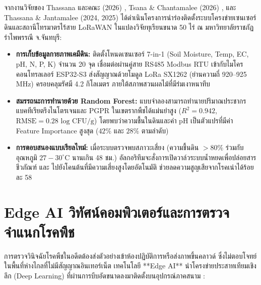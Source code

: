 \begin{application}
จากงานวิจัยของ Thassana และคณะ (2026) \cite{thassana_2026}, Tsana \& Chantamalee (2026) \cite{tsana2026edge}, และ Thassana \& Jantamalee (2024, 2025) \cite{thassana_2024_soil, thassana_2025_aiot} ได้ดำเนินโครงการนำร่องติดตั้งระบบโครงข่ายเซนเซอร์ดินและสถานีโทรมาตรไร้สาย LoRaWAN ในแปลงวิจัยทุเรียนขนาด 50 ไร่ ณ มหาวิทยาลัยราชภัฏรำไพพรรณี จ.จันทบุรี:
\begin{itemize}
    \item \textbf{การเก็บข้อมูลกายภาพเคมีดิน:} ติดตั้งโหนดเซนเซอร์ 7-in-1 (Soil Moisture, Temp, EC, pH, N, P, K) จำนวน 20 จุด เชื่อมต่อผ่านคู่สาย RS485 Modbus RTU เข้ากับไมโครคอนโทรลเลอร์ ESP32-S3 ส่งสัญญาณด้วยโมดูล LoRa SX1262 (ย่านความถี่ 920--925 MHz) ครอบคลุมรัศมี 4.2 กิโลเมตร ภายใต้สภาพสวนผลไม้ที่มีร่มเงาหนาทึบ
    \item \textbf{สมรรถนะการทำนายด้วย Random Forest:} แบบจำลองสามารถทำนายปริมาณประชากรแบคทีเรียตรึงไนโตรเจนและ PGPR ในเขตรากพืชได้แม่นยำสูง ($R^2 = 0.942$, $\text{RMSE} = 0.28\text{ log CFU/g}$) โดยพบว่าความชื้นในดินและค่า pH เป็นตัวแปรที่มีค่า Feature Importance สูงสุด ($42\%$ และ $28\%$ ตามลำดับ)
    \item \textbf{การตอบสนองแบบเรียลไทม์:} เมื่อระบบตรวจพบสภาวะเสี่ยง (ความชื้นดิน $>80\%$ ร่วมกับอุณหภูมิ $27-30^\circ\text{C}$ นานเกิน 48 ชม.) อัลกอริทึมจะสั่งการเปิดวาล์วระบบน้ำหยดเพื่อปล่อยสารชีวภัณฑ์  และ  ไปยังโคนต้นที่มีความเสี่ยงสูงโดยอัตโนมัติ ช่วยลดความสูญเสียจากโรคเน่าได้ร้อยละ 58
\end{itemize}
\end{application}

\section{Edge AI วิทัศน์คอมพิวเตอร์และการตรวจจำแนกโรคพืช}

การตรวจวินิจฉัยโรคพืชในอดีตต้องส่งตัวอย่างเข้าห้องปฏิบัติการหรือส่งภาพขึ้นคลาวด์ ซึ่งไม่ตอบโจทย์ในพื้นที่ห่างไกลที่ไม่มีสัญญาณอินเทอร์เน็ต เทคโนโลยี **Edge AI** นำโครงข่ายประสาทเทียมเชิงลึก (Deep Learning) ที่ผ่านการบีบอัดขนาดลงมาติดตั้งบนอุปกรณ์ภาคสนาม \cite{chouhan2020deep, reddy2024edgeai, tsana2026edge}:

